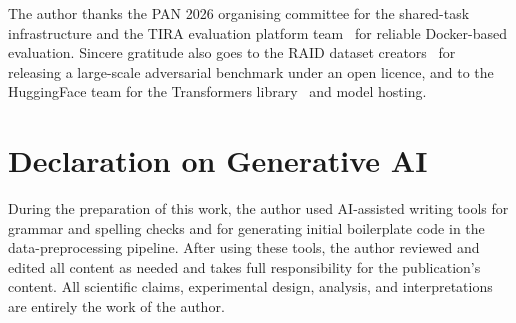 \documentclass[twocolumn]{ceurart}
\begin{document}
\maketitle









\begin{acknowledgments}
  The author thanks the PAN 2026 organising committee for the shared-task infrastructure and the
  TIRA evaluation platform team~\cite{froebe:2023b} for reliable Docker-based evaluation. Sincere
  gratitude also goes to the RAID dataset creators~\cite{dugan:2024} for releasing a large-scale
  adversarial benchmark under an open licence, and to the HuggingFace team for the Transformers
  library~\cite{wolf:2020} and model hosting.
\end{acknowledgments}

\section*{Declaration on Generative AI}
During the preparation of this work, the author used AI-assisted writing tools for grammar and
spelling checks and for generating initial boilerplate code in the data-preprocessing pipeline.
After using these tools, the author reviewed and edited all content as needed and takes full
responsibility for the publication's content. All scientific claims, experimental design, analysis,
and interpretations are entirely the work of the author.


\end{document}
